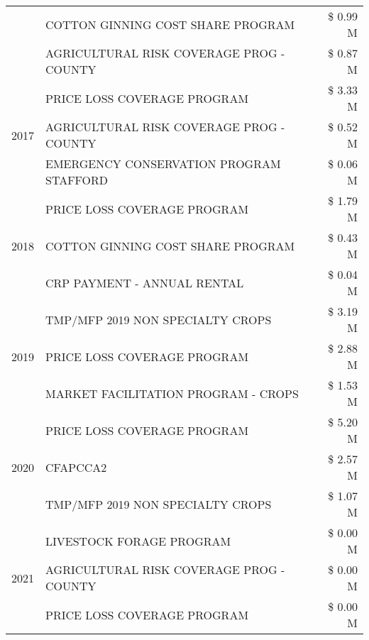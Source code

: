 \begin{tabular}{llr}
 & COTTON GINNING COST SHARE PROGRAM & \$ 0.99 M \\
 & AGRICULTURAL RISK COVERAGE PROG - COUNTY & \$ 0.87 M \\
\cline{1-3}
\multirow[t]{3}{*}{2017} & PRICE LOSS COVERAGE PROGRAM & \$ 3.33 M \\
 & AGRICULTURAL RISK COVERAGE PROG - COUNTY & \$ 0.52 M \\
 & EMERGENCY CONSERVATION PROGRAM STAFFORD & \$ 0.06 M \\
\cline{1-3}
\multirow[t]{3}{*}{2018} & PRICE LOSS COVERAGE PROGRAM & \$ 1.79 M \\
 & COTTON GINNING COST SHARE PROGRAM & \$ 0.43 M \\
 & CRP PAYMENT - ANNUAL RENTAL & \$ 0.04 M \\
\cline{1-3}
\multirow[t]{3}{*}{2019} & TMP/MFP 2019 NON SPECIALTY CROPS & \$ 3.19 M \\
 & PRICE LOSS COVERAGE PROGRAM & \$ 2.88 M \\
 & MARKET FACILITATION PROGRAM - CROPS & \$ 1.53 M \\
\cline{1-3}
\multirow[t]{3}{*}{2020} & PRICE LOSS COVERAGE PROGRAM & \$ 5.20 M \\
 & CFAPCCA2 & \$ 2.57 M \\
 & TMP/MFP 2019 NON SPECIALTY CROPS & \$ 1.07 M \\
\cline{1-3}
\multirow[t]{3}{*}{2021} & LIVESTOCK FORAGE PROGRAM & \$ 0.00 M \\
 & AGRICULTURAL RISK COVERAGE PROG - COUNTY & \$ 0.00 M \\
 & PRICE LOSS COVERAGE PROGRAM & \$ 0.00 M \\
\cline{1-3}
\bottomrule
\end{tabular}
